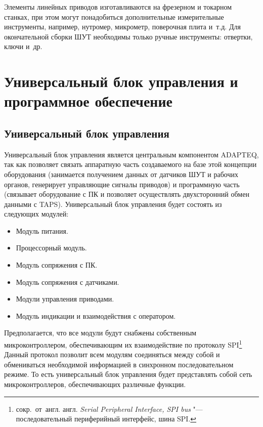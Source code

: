 Элементы линейных приводов изготавливаются на фрезерном и токарном станках, при этом могут понадобиться дополнительные измерительные инструменты, например, нутромер, микрометр, поверочная плита и~т.\:д. Для окончательной сборки ШУТ необходимы только ручные инструменты: отвертки, ключи и~др.

\section{Универсальный блок управления и программное обеспечение}

\subsection{Универсальный блок управления}

Универсальный блок управления является центральным компонентом \foreignlanguage{english}{ADAPTEQ}, так как позволяет связать аппаратную часть создаваемого на базе этой концепции оборудования (занимается получением данных от датчиков ШУТ и рабочих органов, генерирует управляющие сигналы приводов) и программную часть (связывает оборудование с ПК и позволяет осуществлять двухсторонний обмен данными с \foreignlanguage{english}{TAPS}). Универсальный блок управления будет состоять из следующих модулей:

\begin{itemize}
	\item Модуль питания.
	
	\item Процессорный модуль.
	
	\item Модуль сопряжения с ПК.
	
	\item Модуль сопряжения с датчиками.
	
	\item Модули управления приводами.
	
	\item Модуль индикации и взаимодействия с оператором.
\end{itemize}

Предполагается, что все модули будут снабжены собственным микроконтроллером, обеспечивающим их взаимодействие по протоколу \foreignlanguage{english}{SPI}\footnote{сокр.~от~англ. англ. \textit{Serial Peripheral Interface, SPI bus} "--- последовательный периферийный интерфейс, шина SPI.} Данный протокол позволит всем модулям соединяться между собой и обмениваться необходимой информацией в синхронном последовательном режиме. То есть универсальный блок управления будет представлять собой сеть микроконтроллеров, обеспечивающих различные функции.

